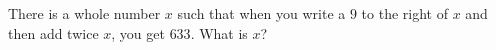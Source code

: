 There is a whole number $x$ such that when you write a $9$ to the right of $x$ and then add twice $x$, you get $633$. What is $x$?
